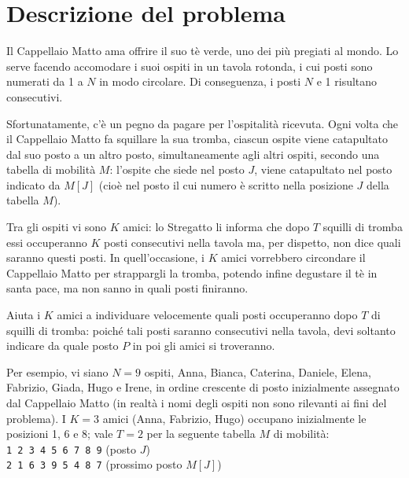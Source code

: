 \documentclass[a4paper,11pt]{article}
\begin{document}
\vspace{0.5cm}



\vspace{0.5cm}

\section*{Descrizione del problema}
  
Il Cappellaio Matto ama offrire il suo tè verde, uno dei
più pregiati al mondo. Lo serve facendo accomodare i suoi
ospiti in un tavola rotonda, i cui posti sono numerati da 1 a
$N$ in modo circolare. Di conseguenza, i posti $N$ e
1 risultano consecutivi.

Sfortunatamente, c'è un pegno da pagare per l'ospitalità
ricevuta. Ogni volta che il Cappellaio Matto fa squillare la sua
tromba, ciascun ospite viene catapultato dal suo posto a un altro
posto, simultaneamente agli altri ospiti, secondo una tabella di
mobilità $M$: l'ospite che siede nel posto
$J$, viene catapultato nel posto indicato da $M[J]$
(cioè nel posto il cui numero è
scritto nella posizione $J$ della tabella $M$).

Tra gli ospiti vi sono $K$ amici: lo Stregatto li informa che
dopo $T$ squilli di tromba essi occuperanno $K$
posti consecutivi nella tavola ma, per dispetto, non dice quali
saranno questi posti. In quell'occasione, i $K$ amici
vorrebbero circondare il Cappellaio Matto per strappargli la tromba,
potendo infine degustare il tè in santa pace, ma non sanno
in quali posti finiranno.

Aiuta i $K$ amici a individuare velocemente quali posti
occuperanno dopo $T$ di squilli di tromba: poiché tali
posti saranno consecutivi nella tavola, devi soltanto indicare da
quale posto $P$ in poi gli amici si troveranno.

Per esempio, vi siano $N=9$ ospiti, Anna, Bianca, Caterina,
Daniele, Elena, Fabrizio, Giada, Hugo e Irene, in ordine crescente di
posto inizialmente assegnato dal Cappellaio Matto (in realtà i
nomi degli ospiti non sono rilevanti ai fini del problema). I
$K=3$ amici (Anna, Fabrizio, Hugo) occupano inizialmente le
posizioni 1, 6 e 8; vale $T=2$ per la seguente
tabella $M$ di mobilità:\\
\texttt{1 2 3 4 5 6 7 8 9} (posto $J$)\\
\texttt{2 1 6 3 9 5 4 8 7} (prossimo posto $M[J]$)
\end{document}
